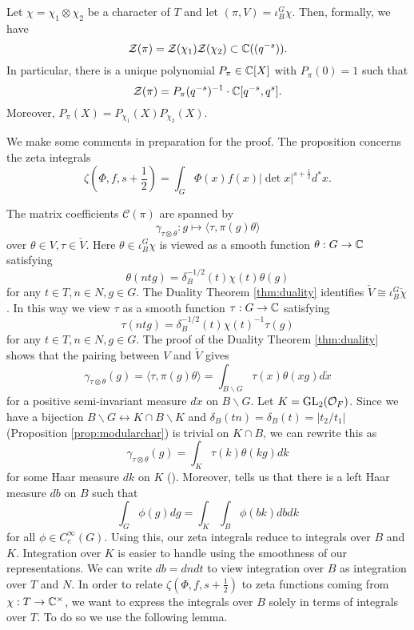 \begin{prop}\label{prop:gl2factor}
    Let $\chi=\chi_1\otimes \chi_2$ be a character of $T$ and let $(\pi,V)=\iota_B^G \chi$. Then, formally, we have
    $$\mathcal Z(\pi) = \mathcal Z(\chi_1) \mathcal Z(\chi_2) \subset \mathbb{C}((q^{-s})).$$
    In particular, there is a unique polynomial $P_\pi \in \mathbb{C}[X]$ with $P_\pi(0)=1$ such that 
    $$\mathcal Z(\pi) = P_\pi(q^{-s})^{-1} \cdot \mathbb{C}[q^{-s},q^s].$$
    Moreover, $P_\pi(X) = P_{\chi_1}(X)P_{\chi_2}(X)$.
\end{prop}

We make some comments in preparation for the proof. The proposition concerns the zeta integrals 
$$\zeta\left(\Phi,f,s+\frac{1}{2}\right) = \int_{G} \Phi(x)f(x)|\det x|^{s+\frac{1}{2}} d^*x.$$

The matrix coefficients $\mathcal C(\pi)$ are spanned by 
$$\gamma_{\tau \otimes \theta} : g \mapsto \langle \tau, \pi(g) \theta \rangle$$ over $\theta \in V, \tau \in \check{V}$. Here $\theta \in \iota_B^G \chi$ is viewed as a smooth function $\theta : G \to \mathbb{C}$ satisfying 
$$\theta(ntg) = \delta_B^{-1/2}(t) \chi(t) \theta(g)$$
for any $t \in T, n \in N, g \in G$. The Duality Theorem \ref{thm:duality} identifies $\check{V} \cong \iota_B^G \check{\chi}$. In this way we view $\tau$ as a smooth function $\tau: G \to \mathbb{C}$ satisfying
$$\tau(ntg) = \delta_B^{-1/2}(t)\chi(t)^{-1}\tau(g)$$
for any $t \in T, n \in N, g \in G$. The proof of the Duality Theorem \ref{thm:duality} shows that the pairing between $V$ and $\check{V}$ gives
$$\gamma_{\tau \otimes \theta}(g) = \langle \tau, \pi(g)\theta \rangle = \int_{B\backslash G} \tau(x)\theta(xg) d\dot{x}$$ for a positive semi-invariant measure $d\dot{x}$ on $B \backslash G$. Let $K=\mathrm{GL}_2(\mathcal{O}_F)$. Since we have a bijection $B \backslash G \leftrightarrow K \cap B \backslash K$ and $\delta_B(tn)=\delta_B(t) = |t_2/t_1|$ (Proposition \ref{prop:modularchar}) is trivial on $K\cap B$, we can rewrite this as 
$$\gamma_{\tau \otimes \theta}(g) = \int_K \tau(k)\theta(kg)dk$$ for some Haar measure $dk$ on $K$ (\cite[Corollary 7.6]{BH1}). Moreover, \cite[Equation 7.6.2]{BH1} tells us that there is a left Haar measure $db$ on $B$ such that
$$\int_G \phi(g) dg = \int_K \int_B \phi(bk) dbdk$$ for all $\phi \in C_c^\infty(G)$. Using this, our zeta integrals reduce to integrals over $B$ and $K$. Integration over $K$ is easier to handle using the smoothness of our representations. We can write $db = dn dt$ to view integration over $B$ as integration over $T$ and $N$. In order to relate $\zeta(\Phi,f,s+\frac{1}{2})$ to zeta functions coming from $\chi: T \to \mathbb{C}^\times$, we want to express the integrals over $B$ solely in terms of integrals over $T$. To do so we use the following lemma. 

